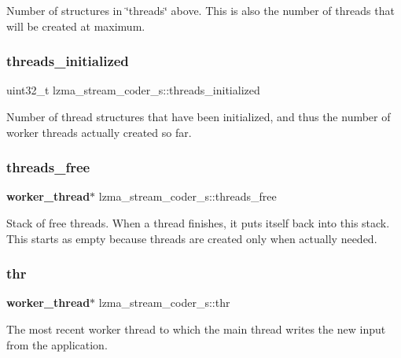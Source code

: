 Number of structures in \char`\"{}threads\char`\"{} above. This is also the number of threads that will be created at maximum. \mbox{\label{structlzma__stream__coder__s_aee6489a39fbf768d4d846cff0064751b}} 
\subsubsection{threads\+\_\+initialized}
{\footnotesize\ttfamily uint32\+\_\+t lzma\+\_\+stream\+\_\+coder\+\_\+s\+::threads\+\_\+initialized}

Number of thread structures that have been initialized, and thus the number of worker threads actually created so far. \mbox{\label{structlzma__stream__coder__s_abaa647d730101c8a8d46aa5dea38b3d0}} 
\subsubsection{threads\+\_\+free}
{\footnotesize\ttfamily \textbf{ worker\+\_\+thread}$\ast$ lzma\+\_\+stream\+\_\+coder\+\_\+s\+::threads\+\_\+free}

Stack of free threads. When a thread finishes, it puts itself back into this stack. This starts as empty because threads are created only when actually needed. \mbox{\label{structlzma__stream__coder__s_a8eb918678d4fcd59b79abece52438e01}} 
\subsubsection{thr}
{\footnotesize\ttfamily \textbf{ worker\+\_\+thread}$\ast$ lzma\+\_\+stream\+\_\+coder\+\_\+s\+::thr}

The most recent worker thread to which the main thread writes the new input from the application. \mbox{\label{structlzma__stream__coder__s_ab29391437d9e3cc8fdc4cff68b0c4a95}} 
